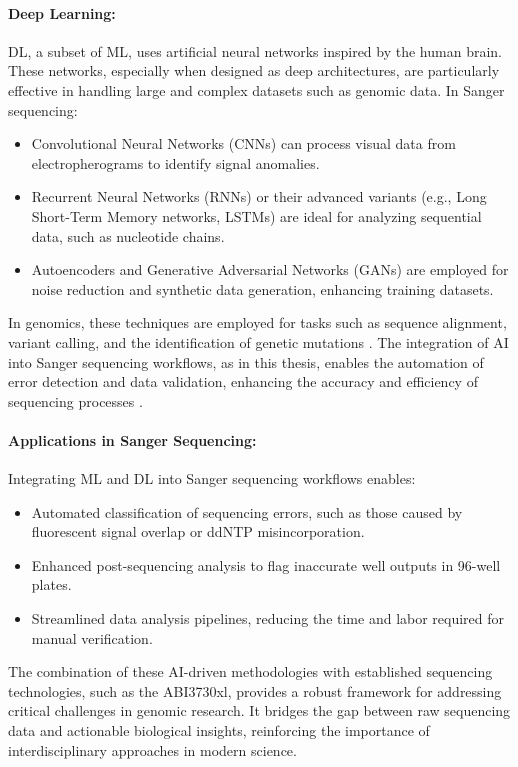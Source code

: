 \paragraph{Deep Learning:}
DL, a subset of ML, uses artificial neural networks inspired by the human brain. These networks, especially when designed as deep architectures, are particularly effective in handling large and complex datasets such as genomic data. In Sanger sequencing:
\begin{itemize}
\item Convolutional Neural Networks (CNNs) can process visual data from electropherograms to identify signal anomalies.
\item Recurrent Neural Networks (RNNs) or their advanced variants (e.g., Long Short-Term Memory networks, LSTMs) are ideal for analyzing sequential data, such as nucleotide chains.
\item Autoencoders and Generative Adversarial Networks (GANs) are employed for noise reduction and synthetic data generation, enhancing training datasets.
\end{itemize}

In genomics, these techniques are employed for tasks such as sequence alignment, variant calling, and the identification of genetic mutations \cite{ml_dna_applications}. The integration of AI into Sanger sequencing workflows, as in this thesis, enables the automation of error detection and data validation, enhancing the accuracy and efficiency of sequencing processes \cite{ai_sanger_sequencing,esteva_ai_genomics}.

\paragraph{Applications in Sanger Sequencing:}
Integrating ML and DL into Sanger sequencing workflows enables:
\begin{itemize}
\item Automated classification of sequencing errors, such as those caused by fluorescent signal overlap or ddNTP misincorporation.
\item Enhanced post-sequencing analysis to flag inaccurate well outputs in 96-well plates.
\item Streamlined data analysis pipelines, reducing the time and labor required for manual verification.
\end{itemize}

The combination of these AI-driven methodologies with established sequencing technologies, such as the ABI3730xl, provides a robust framework for addressing critical challenges in genomic research. It bridges the gap between raw sequencing data and actionable biological insights, reinforcing the importance of interdisciplinary approaches in modern science.
  
